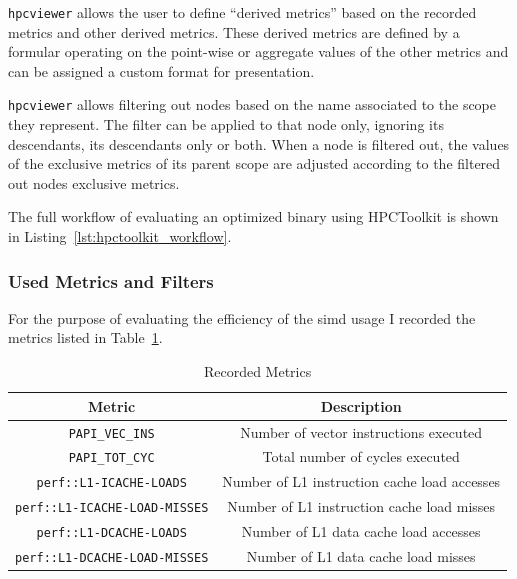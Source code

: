 \documentclass[a4paper, 11pt]{memoir}
\begin{document}
    \texttt{hpcviewer} allows the user to define \enquote{derived metrics} based on the recorded metrics and other
    derived metrics. These derived metrics are defined by a formular operating on the point-wise or aggregate values of
    the other metrics and can be assigned a custom format for presentation.

    \texttt{hpcviewer} allows filtering out nodes based on the name associated to the scope they represent. The
    filter can be applied to that node only, ignoring its descendants, its descendants only or both. When a node is filtered
    out, the values of the exclusive metrics of its parent scope are adjusted according to the filtered out nodes exclusive
    metrics.

    The full workflow of evaluating an optimized binary using HPCToolkit is shown in Listing~\ref{lst:hpctoolkit_workflow}.

    \subsubsection{Used Metrics and Filters}
    For the purpose of evaluating the efficiency of the \gls{simd} usage I recorded the metrics listed in Table~\ref{tab:metrics}.
    \begin{table}[b]
        \centering
        \begin{tabular}{|c|c|}
            \hline
            Metric & Description \\\hline
            \texttt{PAPI_VEC_INS} & Number of vector instructions executed\\
            \texttt{PAPI_TOT_CYC} & Total number of cycles executed\\
            \texttt{perf::L1-ICACHE-LOADS} & Number of L1 instruction cache load accesses\\
            \texttt{perf::L1-ICACHE-LOAD-MISSES} & Number of L1 instruction cache load misses\\
            \texttt{perf::L1-DCACHE-LOADS} & Number of L1 data cache load accesses\\
            \texttt{perf::L1-DCACHE-LOAD-MISSES} & Number of L1 data cache load misses\\
            \hline
        \end{tabular}
        \caption{Recorded Metrics}
        \label{tab:metrics}
    \end{table}
\end{document}
